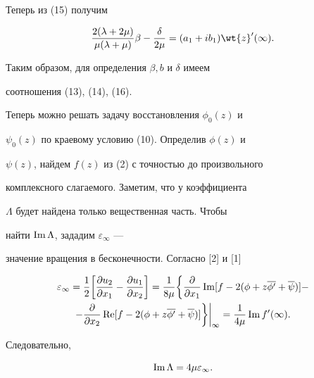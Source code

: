 Теперь из (15) получим


\begin{equation}


\frac{2(\lambda + 2\mu)}{\mu(\lambda + \mu)}\beta -


\frac{\delta}{2\mu} = (a_1 + i b_1) \wt{z}'(\infty). 


\end{equation}


Таким образом, для определения $\beta, b$ и $\delta$ имеем


соотношения (13), (14), (16).





Теперь можно решать задачу восстановления $\phi_0(z)$ и


$\psi_0(z)$ по краевому условию (10). Определив $\phi(z)$ и


$\psi(z)$, найдем $f(z)$ из (2) с точностью до произвольного


комплексного слагаемого. Заметим, что у коэффициента


$\Lambda$ будет найдена только вещественная часть. Чтобы


найти $\operatorname{Im} \Lambda$, зададим $\varepsilon_{\infty}$ ---


значение вращения в бесконечности. Согласно [2] и [1]


\begin{multline*}


\varepsilon_{\infty} = \frac{1}{2}\bigg[\frac{\partial u_2}{\partial x_1} -


\frac{\partial u_1}{\partial x_2}\bigg] = \frac{1}{8\mu} \bigg\{


\frac{\partial}{\partial x_1} \im [ f - 2(\phi + z\overline{\phi'} +


\overline{\psi})] - \\


%


- \frac{\partial}{\partial x_2} \re [f - 2(\phi + z\overline{\phi'} +


\overline{\psi})]\bigg\}\bigg|_{\infty} = \frac{1}{4\mu} \im f'(\infty).


\end{multline*}


Следовательно,


\begin{equation}


\im \Lambda = 4 \mu \varepsilon_{\infty}. 


\end{equation}


